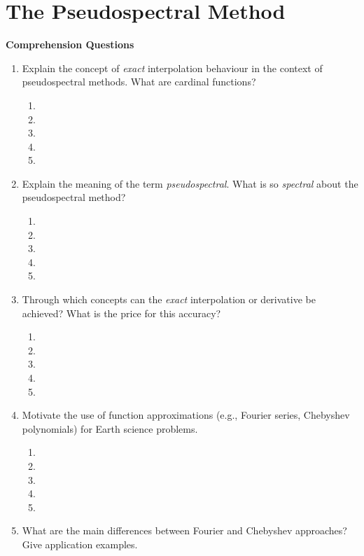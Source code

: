 
\chapter{The Pseudospectral Method} 

{\bf Comprehension Questions}
\begin{enumerate}
\item
Explain the concept of \textit{exact} interpolation behaviour in the context of pseudospectral methods. What are cardinal functions? 
\begin{enumerate}
\item[]
\item[]
\item[] 
\item[]
\item[] 
\end{enumerate}
\item
Explain the meaning of the term {\it pseudospectral}. What is so {\it spectral} about the pseudospectral method?  
\begin{enumerate}
\item[]
\item[]
\item[] 
\item[]
\item[] 
\end{enumerate}
\item
Through which concepts can the {\it exact} interpolation or derivative be achieved? What is the price for this accuracy?
\begin{enumerate}
\item[]
\item[]
\item[] 
\item[]
\item[] 
\end{enumerate}
\item
Motivate the use of function approximations (e.g., Fourier series, Chebyshev polynomials) for Earth science problems. 
\begin{enumerate}
\item[]
\item[]
\item[] 
\item[]
\item[] 
\end{enumerate}
\item
What are the main differences between Fourier and Chebyshev approaches? Give application examples.

\end{enumerate}
